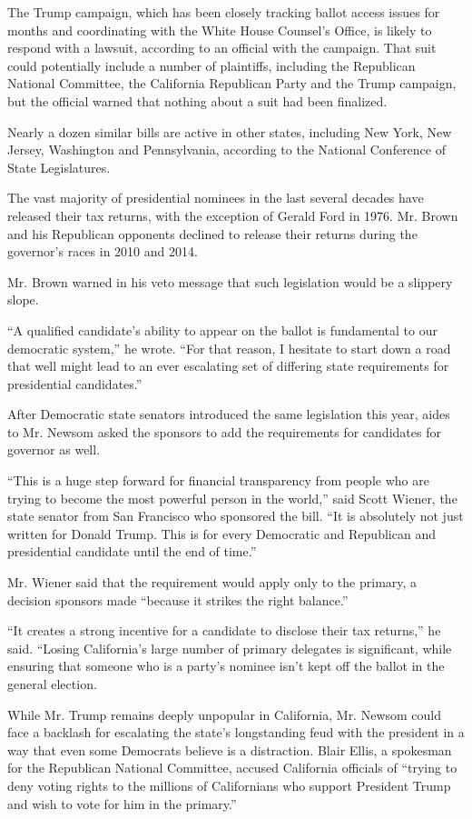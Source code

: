 The Trump campaign, which has been closely tracking ballot access issues
for months and coordinating with the White House Counsel's Office, is
likely to respond with a lawsuit, according to an official with the
campaign. That suit could potentially include a number of plaintiffs,
including the Republican National Committee, the California Republican
Party and the Trump campaign, but the official warned that nothing about
a suit had been finalized.

Nearly a dozen similar bills are active in other states, including New
York, New Jersey, Washington and Pennsylvania, according to the National
Conference of State Legislatures.

The vast majority of presidential nominees in the last several decades
have released their tax returns, with the exception of Gerald Ford in
1976. Mr. Brown and his Republican opponents declined to release their
returns during the governor's races in 2010 and 2014.

Mr. Brown warned in his veto message that such legislation would be a
slippery slope.

``A qualified candidate's ability to appear on the ballot is fundamental
to our democratic system,'' he wrote. ``For that reason, I hesitate to
start down a road that well might lead to an ever escalating set of
differing state requirements for presidential candidates.''

After Democratic state senators introduced the same legislation this
year, aides to Mr. Newsom asked the sponsors to add the requirements for
candidates for governor as well.

``This is a huge step forward for financial transparency from people who
are trying to become the most powerful person in the world,'' said Scott
Wiener, the state senator from San Francisco who sponsored the bill.
``It is absolutely not just written for Donald Trump. This is for every
Democratic and Republican and presidential candidate until the end of
time.''

Mr. Wiener said that the requirement would apply only to the primary, a
decision sponsors made ``because it strikes the right balance.''

``It creates a strong incentive for a candidate to disclose their tax
returns,'' he said. ``Losing California's large number of primary
delegates is significant, while ensuring that someone who is a party's
nominee isn't kept off the ballot in the general election.

While Mr. Trump remains deeply unpopular in California, Mr. Newsom could
face a backlash for escalating the state's longstanding feud with the
president in a way that even some Democrats believe is a distraction.
Blair Ellis, a spokesman for the Republican National Committee, accused
California officials of ``trying to deny voting rights to the millions
of Californians who support President Trump and wish to vote for him in
the primary.''

